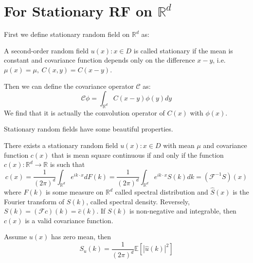 \section{For Stationary RF on $\mathbb{R}^d$}
First we define stationary random field on $\mathbb{R}^d$ as:
\begin{definition}
  A second-order random field ${u(x): x\in D}$ is called stationary if the mean is constant and covariance function 
  depends only on the difference $x-y$, i.e. $\mu(x) = \mu,\ C(x, y) = C(x-y)$.
\end{definition}
Then we can define the covariance operator $\mathcal{C}$ as:
\begin{equation}
  \mathcal{C}\phi = \int_{\mathbb{R}^d} C(x-y)\phi(y)dy
\end{equation}
We find that it is actually the convolution operator of $C(x)$ with $\phi(x)$.

Stationary random fields have some beautiful properties.
\begin{theorem}
    There exists a stationary random field ${u(x): x\in D}$ with mean $\mu$ and covariance function $c(x)$ that is mean square continuous if and only if 
    the function $c(x): \mathbb{R}^d\rightarrow \mathbb{R}$ is such that 
    \begin{equation}
        c(x) = \frac{1}{(2\pi)^{d}}\int_{\mathbb{R}^d} e^{ik \cdot x}dF(k)=\frac{1}{(2\pi)^{d}}\int_{\mathbb{R}^d} e^{ik \cdot x}S(k)dk = \left(\mathcal{F}^{-1}S\right)(x)
    \end{equation}
    where $F(k)$ is some measure on $\mathbb{R}^d$ called spectral distribution and $\hat{S}(x)$ is the Fourier transform of $S(k)$, 
	called spectral density.
    Reversely, $S(k) = \left(\mathcal{F}c\right)(k) = \hat{c}(k)$.
    If $S(k)$ is non-negative and integrable, then $c(x)$ is a valid covariance function.
\end{theorem}

\begin{theorem}\label{spectral_density_random_field}
	Assume $u(x)$ has zero mean, then 
\begin{equation}\label{spectraldensity}
	S_u(k)=\frac{1}{(2\pi)^{d}}\mathbb{E}[|\hat{u}(k)|^2]
\end{equation}
\end{theorem}




